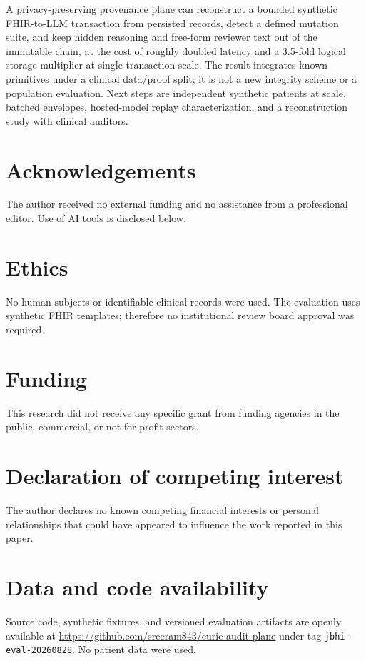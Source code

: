 \documentclass[preprint,review,12pt]{elsarticle}
\begin{document}
A privacy-preserving provenance plane can reconstruct a bounded synthetic
FHIR-to-LLM transaction from persisted records, detect a defined mutation
suite, and keep hidden reasoning and free-form reviewer text out of the
immutable chain, at the cost of roughly doubled latency and a 3.5-fold logical
storage multiplier at single-transaction scale. The result integrates known
primitives under a clinical data/proof split; it is not a new integrity
scheme or a population evaluation. Next steps are independent synthetic
patients at scale, batched envelopes, hosted-model replay characterization,
and a reconstruction study with clinical auditors.

\section{Acknowledgements}
\label{sec:ack}

The author received no external funding and no assistance from a
professional editor. Use of AI tools is disclosed below.

\section*{Ethics}
No human subjects or identifiable clinical records were used. The evaluation
uses synthetic FHIR templates; therefore no institutional review board
approval was required.

\section*{Funding}
This research did not receive any specific grant from funding agencies in the
public, commercial, or not-for-profit sectors.

\section*{Declaration of competing interest}
The author declares no known competing financial interests or personal
relationships that could have appeared to influence the work reported in this
paper.

\section*{Data and code availability}
Source code, synthetic fixtures, and versioned evaluation artifacts are
openly available at \url{https://github.com/sreeram843/curie-audit-plane}
under tag \texttt{jbhi-eval-20260828}. No patient data were used.
\end{document}
